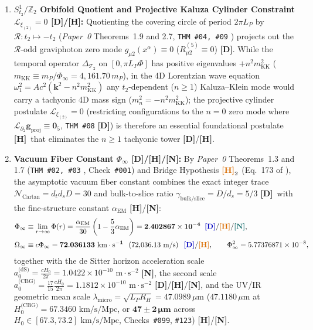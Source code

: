 \documentclass[11pt,a4paper]{article}
\newcommand{\catD}{\textbf{\textcolor{blue!75!black}{[D]}}}
\newcommand{\catH}{\textbf{\textcolor{orange!85!black}{[H]}}}
\newcommand{\catN}{\textbf{\textcolor{teal!75!black}{[N]}}}
\theoremstyle{plain}
\theoremstyle{definition}
\theoremstyle{remark}
\numberwithin{equation}{section}
\begin{document}
\begin{enumerate}
  \item \textbf{$S^1_{t_2}/\mathbb{Z}_2$ Orbifold Quotient and Projective Kaluza Cylinder Constraint $\mathcal{L}_{\xi_{(2)}} = 0$ \catD/\catH:} Quotienting the covering circle of period $2\pi L_P$ by $\mathcal{R}: t_2 \mapsto -t_2$ (\textit{Paper~0} Theorems~1.9 and 2.7, \texttt{THM \#04, \#09} \cite{jimenez2026_p0}) projects out the $\mathcal{R}$-odd graviphoton zero mode $g_{\mu 2}(x^\alpha) \equiv 0$ ($R_{\mu 2}^{(5)} \equiv 0$) \catD. While the temporal operator $\Delta_{\mathcal{T}_2}$ on $[0, \pi L_P\Phi]$ has positive eigenvalues $+n^2 m_{\text{KK}}^2$ ($m_{\text{KK}} \equiv m_P/\Phi_{\infty} = 4{,}161.70\,m_P$), in the 4D Lorentzian wave equation $\omega_1^2 = A c^2(\bm{k}^2 - n^2 m_{\text{KK}}^2)$ any $t_2$-dependent ($n \ge 1$) Kaluza--Klein mode would carry a tachyonic 4D mass sign ($m_n^2 = -n^2 m_{\text{KK}}^2$); the projective cylinder postulate $\mathcal{L}_{\xi_{(2)}} = 0$ (restricting configurations to the $n = 0$ zero mode where $\mathcal{L}_{\partial_2}\mathbf{g}_{\text{proj}} \equiv \mathbf{0}_5$, \texttt{THM \#08} \catD) is therefore an essential foundational postulate \catH\ that eliminates the $n \ge 1$ tachyonic tower \catD/\catH.
  \item \textbf{Vacuum Fiber Constant $\Phi_{\infty}$ \catD/\catH/\catN:} By \textit{Paper~0} Theorems~1.3 and 1.7 (\texttt{THM \#02, \#03} \cite{jimenez2026_p0}, Check~\texttt{\#001}) and Bridge Hypothesis $\catH_2$ (Eq.~173 of \cite{jimenez2026_p0}), the asymptotic vacuum fiber constant combines the exact integer trace $\mathcal{N}_{\text{Cartan}} = d_t d_s D = 30$ and bulk-to-slice ratio $\gamma_{\text{bulk/slice}} = D/d_s = 5/3$ \catD\ with the fine-structure constant $\alpha_{\text{EM}}$ \catH/\catN:
  \begin{align}
  \Phi_{\infty} &\equiv \lim_{r \to \infty} \Phi(r) = \frac{\alpha_{\text{EM}}}{30}\left(1 - \frac{5}{3}\alpha_{\text{EM}}\right) = \mathbf{2.402867 \times 10^{-4}} \;\;\catD/\catH/\catN, \nonumber \\[3pt]
  \Omega_{\infty} &\equiv c\Phi_{\infty} = \mathbf{72.036133\text{ km}\cdot\text{s}^{-1}} \;\; \left(72{,}036.13\text{ m/s}\right) \;\;\catD/\catH, \qquad \Phi_{\infty}^2 = 5.77376871 \times 10^{-8},
  \label{eq:fundamental_cbg_invariant_p3}
  \end{align}
  together with the de Sitter horizon acceleration scale $a_0^{\text{(dS)}} = \frac{cH_0}{2\pi} = 1.0422 \times 10^{-10}\text{ m}\cdot\text{s}^{-2}$ \catN, the second scale $a_0^{\text{(CBG)}} = \frac{17}{15}\frac{cH_0}{2\pi} = 1.1812 \times 10^{-10}\text{ m}\cdot\text{s}^{-2}$ \catD/\catH/\catN, and the UV/IR geometric mean scale $\lambda_{\text{micro}} = \sqrt{L_P R_H} = 47.0989\,\mu\text{m}$ ($47.1180\,\mu\text{m}$ at $H_0^{\text{(CBG)}} = 67.3460\text{ km/s/Mpc}$, or $\mathbf{47 \pm 2\,\mu\text{m}}$ across $H_0 \in [67.3, 73.2]\text{ km/s/Mpc}$, Checks~\texttt{\#099}, \texttt{\#123}) \catH/\catN.

\end{enumerate}
\end{document}
